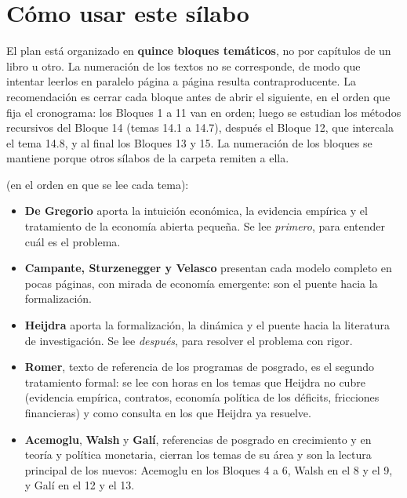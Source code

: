 \documentclass[11pt,a4paper]{article}
\newcommand{\destacado}[1]{{\sffamily\bfseries\color{tonoPrincipal}#1}}
\begin{document}
\tableofcontents
\newpage

\section*{Cómo usar este sílabo}

El plan está organizado en \textbf{quince bloques temáticos}, no por capítulos de
un libro u otro. La numeración de los textos no se corresponde, de modo que
intentar leerlos en paralelo página a página resulta contraproducente. La
recomendación es cerrar cada bloque antes de abrir el siguiente, en el orden que
fija el cronograma: los Bloques 1 a 11 van en orden; luego se estudian los
métodos recursivos del Bloque 14 (temas 14.1 a 14.7), después el Bloque 12, que
intercala el tema 14.8, y al final los Bloques 13 y 15. La numeración de los
bloques se mantiene porque otros sílabos de la carpeta remiten a ella.

\medskip
\noindent\destacado{Criterio general de reparto} (en el orden en que se lee cada tema):
\begin{itemize}[leftmargin=1.4em,itemsep=2pt]
  \item \textcolor{colorDG}{\textbf{De Gregorio}} aporta la intuición económica,
        la evidencia empírica y el tratamiento de la economía abierta pequeña.
        Se lee \emph{primero}, para entender cuál es el problema.
  \item \textcolor{colorCSV}{\textbf{Campante, Sturzenegger y Velasco}} presentan
        cada modelo completo en pocas páginas, con mirada de economía emergente:
        son el puente hacia la formalización.
  \item \textcolor{colorH}{\textbf{Heijdra}} aporta la formalización, la dinámica
        y el puente hacia la literatura de investigación. Se lee \emph{después},
        para resolver el problema con rigor.
  \item \textcolor{colorR}{\textbf{Romer}}, texto de referencia de los programas
        de posgrado, es el segundo tratamiento formal: se lee con horas en los
        temas que Heijdra no cubre (evidencia empírica, contratos, economía
        política de los déficits, fricciones financieras) y como consulta en los
        que Heijdra ya resuelve.
  \item \textcolor{colorA}{\textbf{Acemoglu}}, \textcolor{colorW}{\textbf{Walsh}} y
        \textcolor{colorG}{\textbf{Galí}}, referencias de posgrado en crecimiento y
        en teoría y política monetaria, cierran los temas de su área y son la
        lectura principal de los nuevos: Acemoglu en los Bloques 4 a 6, Walsh en
        el 8 y el 9, y Galí en el 12 y el 13.
\end{itemize}
\end{document}
